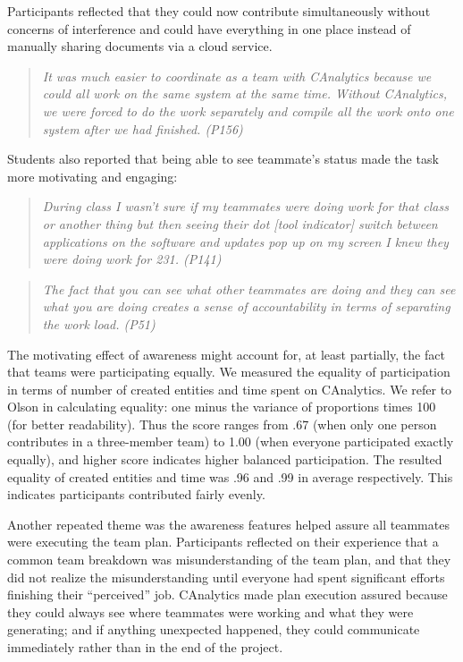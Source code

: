 Participants reflected that they could now contribute simultaneously 
without concerns of interference and could
have everything in one place instead of manually sharing documents via a
cloud service.

\begin{quote}
\emph{It was much easier to coordinate as a team with CAnalytics because we
could all work on the same system at the same time. Without CAnalytics,
we were forced to do the work separately and compile all the work onto
one system after we had finished. (P156)}
\end{quote}

Students also reported that being able to see teammate's status made the
task more motivating and engaging:

\begin{quote}
\emph{During class I wasn't sure if my teammates were doing work for that
class or another thing but then seeing their dot {[}tool indicator{]}
switch between applications on the software and updates pop up on my
screen I knew they were doing work for 231. (P141)}
\end{quote}

\begin{quote}
\emph{The fact that you can see what other teammates are doing and they can
see what you are doing creates a sense of accountability in terms of
separating the work load. (P51)}
\end{quote}

The motivating effect of awareness might account for, at least partially, 
the fact that teams were participating equally. We measured the equality of 
participation in terms of number of created entities and time spent on 
CAnalytics. We refer to Olson \cite{Olson2017} in calculating equality: one 
minus the variance of proportions times 100 (for better readability). Thus 
the score ranges from .67 (when only one person contributes in a three-member 
team) to 1.00 (when everyone participated exactly equally), and higher 
score indicates higher balanced participation. The resulted equality of 
created entities and time was .96 and .99 in average respectively. This 
indicates participants contributed fairly evenly.

Another repeated theme was the awareness features helped assure all teammates were executing
the team plan. Participants reflected on their experience that a common
team breakdown was misunderstanding of the team plan, and that they did 
not realize the misunderstanding until everyone had spent significant efforts 
finishing their ``perceived'' job. CAnalytics made plan execution assured 
because they could always see where teammates were working and what they 
were generating; and if anything unexpected happened, they could communicate 
immediately rather than in the end of the project.

